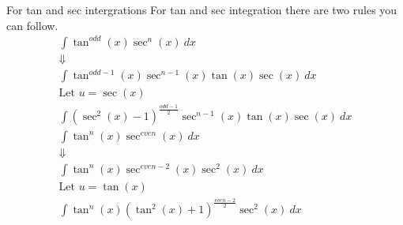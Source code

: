 \documentclass[letterpaper,10pt,twoside,twocolumn,openany]{book}
\begin{document}
\begin{paperbox}[]{For tan and sec intergrations}    
    For tan and sec integration there are two rules you can follow.
    \begin{gather*}
        \int \tan^{odd}(x) \sec^n(x)\ dx \\ 
        \Downarrow \\ 
        \int \tan^{odd-1}(x) \sec^{n-1}(x) \tan(x)\sec(x)\ dx\\
        \text{Let $u = \sec(x)$}\\
        \int (\sec^2(x) - 1)^{\frac{odd-1}{2}}\sec^{n-1}(x) \tan(x)\sec(x)\ dx \\
        \int \tan^n(x) \sec^{even}(x)\ dx\\
        \Downarrow\\
        \int \tan^n(x)\sec^{even-2}(x) \sec^2(x)\ dx\\
        \text{Let $u = \tan(x)$}\\
        \int \tan^n(x)(\tan^2(x) + 1)^{\frac{even-2}{2}}\sec^2(x)\ dx
    \end{gather*}
\end{paperbox}
\newpage
\end{document}
